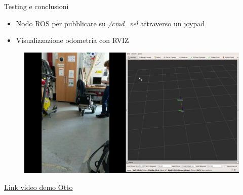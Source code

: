 \documentclass{beamer}
\begin{document}
\begin{tframe}{Testing e conclusioni}

\begin{itemize}
    \item Nodo ROS per pubblicare su \textit{/cmd\_vel} attraverso un joypad
    \item Visualizzazione odometria con RVIZ
\end{itemize}

\vspace{3mm}

\begin{figure}[h]
    \centering
    \includegraphics[scale=0.16]{img/demo.png}
\end{figure}
\centering
{\href{https://youtu.be/fEhBCXqMYPw}{Link video demo Otto}}
\end{tframe}
\end{document}
